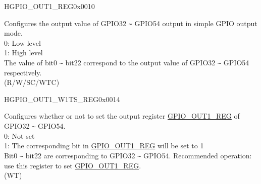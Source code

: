 \begin{register}{H}{GPIO\_OUT1\_REG}{0x0010}\label{regdesc:GPIOOUT1REG}
%
%
\regnewline%
\begin{regdesc}\begin{reglist}
\label{fielddesc:GPIOOUT1DATAORIG}\item [GPIO\_OUT1\_DATA\_ORIG] Configures the output value of GPIO32 \verb+~+ GPIO54 output in simple GPIO output mode.\\
0: Low level\\
1: High level\\
The value of bit0 \verb+~+ bit22 correspond to the output value of GPIO32 \verb+~+ GPIO54 respectively. \\
(R/W/SC/WTC)
\end{reglist}\end{regdesc}
\end{register}


\begin{register}{H}{GPIO\_OUT1\_W1TS\_REG}{0x0014}\label{regdesc:GPIOOUT1W1TSREG}
%
%
\regnewline%
\begin{regdesc}\begin{reglist}
\label{fielddesc:GPIOOUT1W1TS}\item [GPIO\_OUT1\_W1TS] Configures whether or not to set the output register \hyperref[regdesc:GPIOOUT1REG]{GPIO\_OUT1\_REG} of GPIO32 \verb+~+ GPIO54.\\
0: Not set\\
1: The corresponding bit in \hyperref[regdesc:GPIOOUT1REG]{GPIO\_OUT1\_REG} will be set to 1\\
Bit0 \verb+~+ bit22 are corresponding to GPIO32 \verb+~+ GPIO54.
Recommended operation: use this register to set \hyperref[regdesc:GPIOOUT1REG]{GPIO\_OUT1\_REG}. \\
(WT)
\end{reglist}\end{regdesc}
\end{register}


